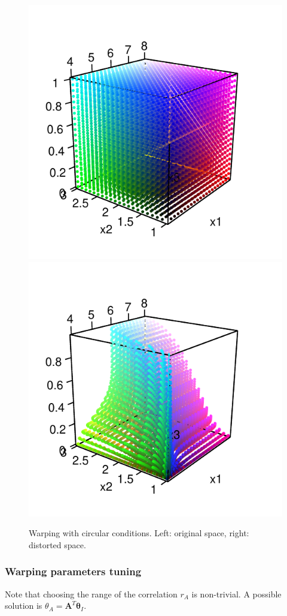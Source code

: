  \begin{figure}[!ht]
 \centering
 \includegraphics[width=.4\textwidth]{def3Dcirc1.pdf}
 \includegraphics[width=.4\textwidth]{def3Dcirc2.pdf}
 \caption{Warping with circular conditions. Left: original space, right: distorted space.}\label{fig:def3Dcirc}
\end{figure}

% 
% 
% 

\subsubsection{Warping parameters tuning}

Note that choosing the range of the correlation $r_A$ is non-trivial. A possible solution is $\theta_A = \mathbf{A}^T \boldsymbol{\theta}_I$.

